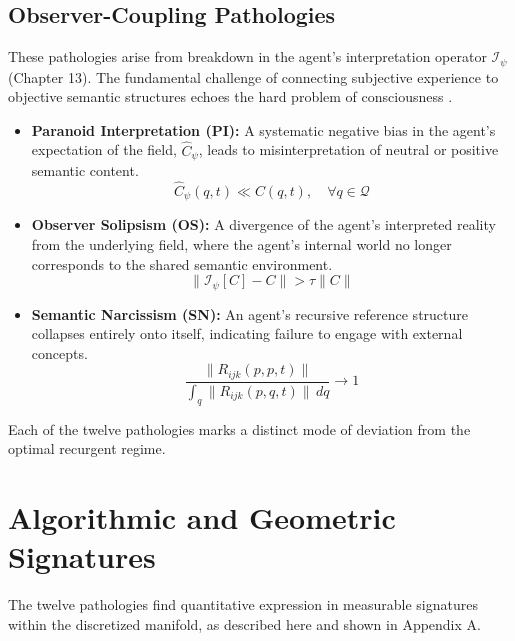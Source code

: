 \subsection{Observer-Coupling Pathologies}

These pathologies arise from breakdown in the agent's interpretation operator \(\mathcal{I}_{\psi}\) (Chapter 13). The fundamental challenge of connecting subjective experience to objective semantic structures echoes the hard problem of consciousness \autocite{Chalmers1996}.

\begin{itemize}
    \item \textbf{Paranoid Interpretation (PI):} A systematic negative bias in the agent's expectation of the field, \(\hat{C}_{\psi}\), leads to misinterpretation of neutral or positive semantic content.
    \begin{equation}
    \hat{C}_{\psi}(q,t) \ll C(q,t), \quad \forall q \in \mathcal{Q}
    \end{equation}

    \item \textbf{Observer Solipsism (OS):} A divergence of the agent's interpreted reality from the underlying field, where the agent's internal world no longer corresponds to the shared semantic environment.
    \begin{equation}
    \|\mathcal{I}_{\psi}[C] - C\| > \tau \|C\|
    \end{equation}

    \item \textbf{Semantic Narcissism (SN):} An agent's recursive reference structure collapses entirely onto itself, indicating failure to engage with external concepts.
    \begin{equation}
    \frac{\|R_{ijk}(p,p,t)\|}{\int_q \|R_{ijk}(p,q,t)\| \, dq} \to 1
    \end{equation}
\end{itemize}

Each of the twelve pathologies marks a distinct mode of deviation from the optimal recurgent regime.

\section{Algorithmic and Geometric Signatures}

The twelve pathologies find quantitative expression in measurable signatures within the discretized manifold, as described here and shown in Appendix A.

